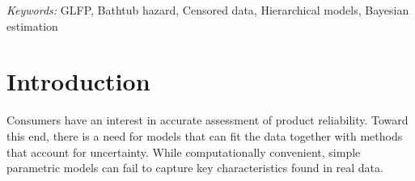 \documentclass[12pt]{article}
\begin{document}
\noindent%
{\it Keywords:} GLFP, Bathtub hazard, Censored data, Hierarchical models, Bayesian estimation
\vfill

\newpage
\tableofcontents
\newpage
{} %
\section{Introduction}
Consumers have an interest in accurate assessment of product reliability. Toward this end, there is a need for models that can fit the data together with methods that account for uncertainty.  While computationally convenient, simple parametric models can fail to capture key characteristics found in real data.

% 
% 
% 
\end{document}

